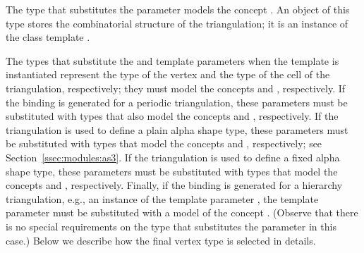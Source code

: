 The type that substitutes the 
parameter models the concept
. An object of this type
stores the combinatorial structure of the triangulation; it is an
instance of the class template
.

The types that substitute the  and
 template parameters when the template
is instantiated represent the type of the vertex and the type of the
cell of the triangulation, respectively; they must model the concepts
 and
, respectively. If the
binding is generated for a periodic triangulation, these parameters
must be substituted with types that also model the concepts
 and
, respectively.
If the triangulation is used to define a plain alpha shape type, these
parameters must be substituted with types that model the concepts
 and
, respectively; see
Section~\ref{ssec:modules:as3}. If the triangulation is used to define
a fixed alpha shape type, these parameters must be substituted with
types that model the concepts 
and , respectively. Finally, if
the binding is generated for a hierarchy triangulation, e.g., an
instance of the template parameter
, the
 template parameter must be substituted with
a model of the concept
. (Observe that
there is no special requirements on the type that substitutes the
 parameter in this case.) Below we describe how
the final vertex type is selected in details.

